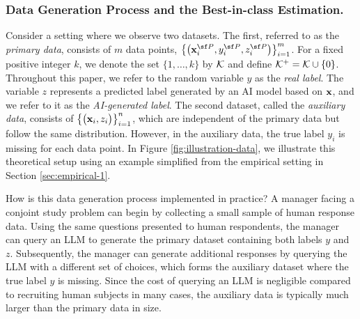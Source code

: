 \subsubsection{Data Generation Process and the Best-in-class Estimation.}
Consider a setting where we observe two datasets. The first, referred to as the \textit{primary data}, consists of $m$ data points, 
$\left\{\big(\x^{\sf P}_{i}, y^{\sf P}_{i}, z^{\sf P}_{i}\big)\right\}_{i = 1}^m$.
For a fixed positive integer $k$, we denote the set $\{1,\dots, k\}$ by $\mathcal{K}$ and define $\mathcal{K}^+ = \mathcal{K} \cup \{0\}$. 
 Throughout this paper, we refer to the random variable $y$ as the \textit{real label}. 
The variable $z$ represents a predicted label generated by an AI model based on $\mathbf{x}$, and we refer to it as the \textit{AI-generated label}. 
The second dataset, called the \textit{auxiliary data}, consists of $\left\{\big(\mathbf{x}_{i}, z_{i}\big)\right\}_{i = 1}^n$, which are independent of the primary data but follow the same distribution. However, in the auxiliary data, the true label $y_i$ is missing for each data point. 
In Figure \ref{fig:illustration-data}, we illustrate this theoretical setup using an example simplified from the empirical setting in Section \ref{sec:empirical-1}. 


How is this data generation process implemented in practice? A manager facing a conjoint study problem can begin by collecting a small sample of human response data. Using the same questions presented to human respondents, the manager can query an LLM to generate the primary dataset containing both labels $y$ and $z$. Subsequently, the manager can generate additional responses by querying the LLM with a different set of choices, which forms the auxiliary dataset where the true label $y$ is missing. Since the cost of querying an LLM is negligible compared to recruiting human subjects in many cases, the auxiliary data is typically much larger than the primary data in size.



